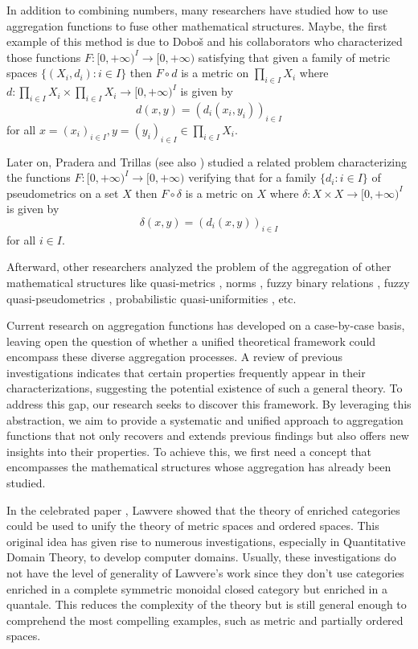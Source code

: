 \documentclass[11pt,a4paper]{amsart}
\theoremstyle{definition}
\begin{document}
	In addition to combining numbers, many researchers have studied how to use aggregation functions to fuse other mathematical structures. Maybe, the first example of this method is due to Dobo\v{s} and his collaborators \cite{BorsikDobos81,Dobos95,Dobos98} who characterized those functions $F:[0,+\infty)^I\to [0,+\infty)$ satisfying that given a family of metric spaces $\Big\{(X_i,d_i):i\in I\Big\}$ then $F\circ d$ is a metric on $\prod_{i\in I}X_i$ where $d:\prod_{i\in I}X_i\times \prod_{i\in I} X_i\to [0,+\infty)^I$ is given by
	$$d(x,y)=(d_i(x_i,y_i))_{i\in I}$$
	for all $x=(x_i)_{i\in I}, y=(y_i)_{i\in I}\in\prod_{i\in I} X_i.$
	
	Later on, Pradera and Trillas \cite{PraTri02} (see also \cite{PraTriCasti02a,MayorVale19}) studied a related problem characterizing the functions $F:[0,+\infty)^I\to [0,+\infty)$ verifying that for a family $\{d_i:i\in I\}$ of pseudometrics on a set $X$ then $F\circ \delta$ is a metric on $X$ where $\delta:X\times X\to [0,+\infty)^I$ is given by
	$$\delta(x,y)=(d_i(x,y))_{i\in I}$$
	for all $i\in I.$
	
	Afterward, other researchers analyzed the problem of the aggregation of other mathematical structures like quasi-metrics \cite{MassaVale13,MayorVale10,MinyaVale19}, norms \cite{HerMos91,MartinMayorVale11,PRL21}, fuzzy binary relations \cite{DrewDud06,DrewDud07,MayorReca16,SamiMesiBoden02}, fuzzy quasi-pseudometrics \cite{PRLVale21}, probabilistic quasi-uniformities \cite{PRL20b}, etc. 
	
	
Current research on aggregation functions has developed on a case-by-case basis, leaving open the question of whether a unified theoretical framework could encompass these diverse aggregation processes. A review of previous investigations indicates that certain properties frequently appear in their characterizations, suggesting the potential existence of such a general theory. To address this gap, our research seeks to discover this framework. By leveraging this abstraction, we aim to provide a systematic and unified approach to aggregation functions that not only recovers and extends previous findings but also offers new insights into their properties. To achieve this, we first need a concept that encompasses the mathematical structures whose aggregation has already been studied.

	

	
	In the celebrated paper \cite{Lawv73}, Lawvere showed that the theory of enriched categories could be used to unify the theory of metric spaces and ordered spaces. This original idea has given rise to numerous investigations, especially in Quantitative Domain Theory, to develop computer domains. Usually, these investigations do not have the level of generality of Lawvere's work since they don't  use categories enriched in a complete symmetric monoidal closed category but enriched in a quantale. This reduces the complexity of the theory but is still general enough to comprehend the most compelling examples, such as metric and partially ordered spaces.
	
\end{document}
